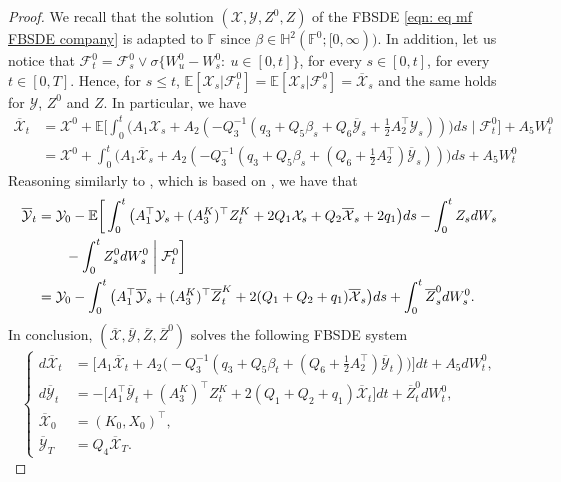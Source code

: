 \documentclass[10pt,a4paper]{amsart}
\numberwithin{equation}{section}
\newcommand{\E}{\mathbb{E}}
\newcommand{\F}{\mathbb{F}}
\newcommand{\ItF}{\mathcal{F}}
\renewcommand{\bar}{\overline}
\begin{document}
\begin{proof}
We recall that the solution $(\mathcal{X},\mathcal{Y},Z^0,Z)$ of the FBSDE \eqref{eqn: eq mf FBSDE company} is adapted to $\F$ since $\beta\in \mathbb{H}^2(\F^0;[0,\infty))$. In addition, let us notice that $\ItF^0_t = \ItF^0_s \vee \sigma\{W^0_u - W^0_s:\ u\in[0,t]\}$, for every $s\in[0,t]$, for every $t\in [0,T]$. Hence, for $s\leq t$, $\E[ \mathcal{X}_s|\ItF^0_t] = \E[ \mathcal{X}_s|\ItF^0_s] = \bar{\mathcal{X}}_s$ and the same holds for $\mathcal{Y}$, $Z^0$ and $Z$. In particular, we have
\begin{align*}
    \bar{\mathcal{X}}_t &= \mathcal{X}^0+ \E\bigg[\int_0^t \big( A_1 \mathcal{X}_s + A_2( -Q_3^{-1} ( q_3  + Q_5\beta_s+ Q_6\overline{\mathcal{Y}}_s+\frac{1}{2} A_2^\top \mathcal{Y}_s)) \big) ds \mid \ItF^0_t\bigg]+ A_5W^0_t\\
        &=  \mathcal{X}^0 + \int_0^t \big( A_1 \bar{\mathcal{X}}_s + A_2( -Q_3^{-1} ( q_3  + Q_5\beta_s+ (Q_6+\frac{1}{2}A_2^\top) \bar{\mathcal{Y}}_s)) \big) ds+ A_5W^0_t
\end{align*}
Reasoning similarly to \cite[Theorem 2.2]{wang2018introduction}, which is based on \cite[Theorem 8.1]{liptser2013statistics}, we have that
\begin{align*}
\bar{\mathcal{Y}}_t &=\mathcal{Y}_0 -\E\bigg[\int_0^t\big( A_1^\top \mathcal{Y}_s + (A^K_3)^\top Z^{K}_t + 2Q_1\mathcal{X}_s + Q_2\overline{\mathcal{X}}_s + 2q_1\big) ds - \int_0^tZ_s dW_s\\
&\qquad - \int_0^tZ^{0}_s dW^0_s\biggm| \ItF^0_t\bigg]\\
&= \mathcal{Y}_0- \int_0^t\big( A_1^\top \bar{\mathcal{Y}}_s + (A^K_3)^\top \bar{Z}^{K}_t + 2(Q_1+Q_2+q_1)\bar{\mathcal{X}}_s \big) ds + \int_0^t\bar{Z}^0_s dW^0_s.
\end{align*}
In conclusion, $(\bar{\mathcal{X}}, \bar{\mathcal{Y}}, \bar{Z}, \bar{Z}^0)$ solves the following FBSDE system 
\begin{equation}
\label{eqn: eq mf FBSDE company projected} 
\begin{cases}
    d\bar{\mathcal{X}}_t&=   \big[ A_1 \bar{\mathcal{X}}_t + A_2\big( -Q_3^{-1} ( q_3  + Q_5\beta_t+( Q_6 +\frac{1}{2} A_2^\top)\overline{\mathcal{Y}}_t)\big)\big] dt  + A_5dW^0_t,\\
    d\bar{\mathcal{Y}}_t &= - \big[A^\top_1 \bar{\mathcal{Y}}_t+ (A^K_3)^\top Z^{K}_t + 2(Q_1 + Q_2 +q_1) \bar{\mathcal{X}}_t \big] dt+ \bar{Z}^0_t dW^0_t, \\
\bar{\mathcal{X}}_0 &= (K_0,X_0)^\top,\\
\bar{\mathcal{Y}}_T &= Q_4\bar{\mathcal{X}}_T.
\end{cases}
\end{equation}


\end{proof}
\end{document}
